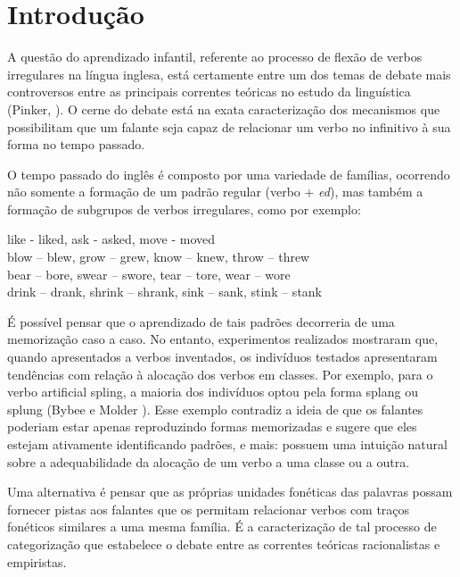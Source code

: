 \chapter{Introdução}
\label{ch:01}

A questão do aprendizado infantil, referente ao processo de flexão de verbos irregulares na língua inglesa, está certamente entre um dos temas de debate mais controversos entre as principais correntes teóricas no estudo da linguística (Pinker, \citeyear{Pinker:1999}). O cerne do debate está na exata caracterização dos mecanismos que possibilitam que um falante seja capaz de relacionar um verbo no infinitivo à sua forma no tempo passado.

O tempo passado do inglês é composto por uma variedade de famílias, ocorrendo não somente a formação de um padrão regular (verbo + \textit{ed}), mas também a formação de subgrupos de verbos irregulares, como por exemplo:

\begin{center}
like - liked, ask - asked, move - moved\\
blow – blew, grow – grew, know – knew, throw – threw\\
bear – bore, swear – swore, tear – tore, wear – wore\\
drink – drank, shrink – shrank, sink – sank, stink – stank \\
\end{center}

É possível pensar que o aprendizado de tais padrões decorreria de uma memorização caso a caso. No entanto, experimentos realizados mostraram que, quando apresentados a verbos inventados, os indivíduos testados apresentaram tendências com relação à alocação dos verbos em classes. Por exemplo, para o verbo artificial spling, a maioria dos indivíduos optou pela forma splang  ou splung (Bybee e Molder \citeyear{Bybee:1983}). Esse exemplo contradiz a ideia de que os falantes poderiam estar apenas reproduzindo formas memorizadas e sugere que eles estejam ativamente identificando padrões, e mais: possuem uma intuição natural sobre a adequabilidade da alocação de um verbo a uma classe ou a outra.

Uma alternativa é pensar que as próprias unidades fonéticas das palavras possam fornecer pistas aos falantes que os permitam relacionar verbos com traços fonéticos similares a uma mesma família. É a caracterização de tal processo de categorização que estabelece o debate entre as correntes teóricas racionalistas e empiristas.  

